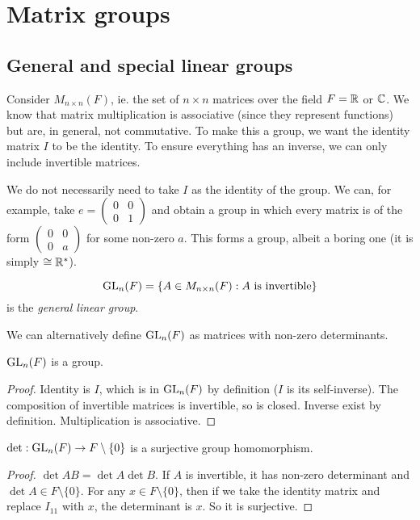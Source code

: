 \documentclass[a4paper]{article}
\begin{document}
  \section{Matrix groups}
  \subsection{General and special linear groups}
  Consider $M_{n\times n}(F)$, ie. the set of $n\times n$ matrices over the field $F = \mathbb{R}$ or $\mathbb{C}$. We know that matrix multiplication is associative (since they represent functions) but are, in general, not commutative. To make this a group, we want the identity matrix $I$ to be the identity. To ensure everything has an inverse, we can only include invertible matrices.

  \note We do not necessarily need to take $I$ as the identity of the group. We can, for example, take $e = 
  \begin{pmatrix}
    0 & 0\\
    0 & 1
  \end{pmatrix}$ and obtain a group in which every matrix is of the form $\begin{pmatrix}
    0 & 0\\
    0 & a
  \end{pmatrix}$ for some non-zero $a$. This forms a group, albeit a boring one (it is simply $\cong \mathbb{R}^*$).
  \begin{defi}
    \[
      \mathrm{GL}_n(F) = \{A\in M_{n\times n}(F) : A\text{ is invertible}\}
    \]
    is the \emph{general linear group}.
  \end{defi}
  \note We can alternatively define $\mathrm{GL}_n(F)$ as matrices with non-zero determinants.

  \begin{prop}
    $\mathrm{GL}_n(F)$ is a group.
  \end{prop}
  \begin{proof}
    Identity is $I$, which is in $\mathrm{GL}_n(F)$ by definition ($I$ is its self-inverse). The composition of invertible matrices is invertible, so is closed. Inverse exist by definition. Multiplication is associative.
  \end{proof}

  \begin{prop}
    $\det: \mathrm{GL}_n(F) \to F\setminus\{0\}$ is a surjective group homomorphism.
  \end{prop}

  \begin{proof}
    $\det AB = \det A\det B$. If $A$ is invertible, it has non-zero determinant and $\det A\in F\setminus\{0\}$. For any $x\in F\setminus\{0\}$, then if we take the identity matrix and replace $I_{11}$ with $x$, the determinant is $x$. So it is surjective.
  \end{proof}
\end{document}
